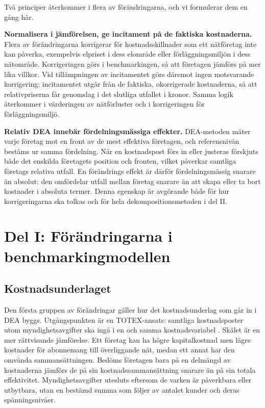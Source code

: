 \documentclass[11pt,a4paper]{article}
\begin{document}
Två principer återkommer i flera av förändringarna, och vi formulerar dem en gång här.

\textbf{Normalisera i jämförelsen, ge incitament på de faktiska kostnaderna.} Flera av
förändringarna korrigerar för kostnadsskillnader som ett nätföretag inte kan påverka, exempelvis
elpriset i dess elområde eller förläggningsmiljön i dess nätområde. Korrigeringen görs i
benchmarkingen, så att företagen jämförs på mer lika villkor. Vid tillämpningen av incitamentet
görs däremot ingen motsvarande korrigering: incitamentet utgår från de faktiska, okorrigerade
kostnaderna, så att relativpriserna får genomslag i det slutliga utfallet i kronor. Samma logik
återkommer i värderingen av nätförluster och i korrigeringen för förläggningsmiljö.

\textbf{Relativ DEA innebär fördelningsmässiga effekter.} DEA-metoden mäter varje företag mot en
front av de mest effektiva företagen, och referensnivån bestäms ur samma fördelning. När en
kostnadspost förs in eller justeras förskjuts både det enskilda företagets position och fronten,
vilket påverkar samtliga företags relativa utfall. En förändrings effekt är därför
fördelningsmässig snarare än absolut: den omfördelar utfall mellan företag snarare än att skapa
eller ta bort kostnader i absoluta termer. Denna egenskap är avgörande både för hur
korrigeringarna ska tolkas och för hela dekompositionsmetoden i del II.

\section{Del I: Förändringarna i benchmarkingmodellen}

\subsection{Kostnadsunderlaget}

Den första gruppen av förändringar gäller hur det kostnadsunderlag som går in i DEA byggs.
Utgångspunkten är en TOTEX-ansats: samtliga kostnadsposter utom myndighetsavgifter ska ingå i en
och samma kostnadsvariabel \citep{Ei2025Benchmarking}. Skälet är en mer rättvisande jämförelse. Ett företag kan ha högre
kapitalkostnad men lägre kostnader för abonnemang till överliggande nät, medan ett annat har den
omvända sammansättningen. Bedöms företagen bara på en delmängd av kostnaderna jämförs de på sin
kostnadssammansättning snarare än på sin totala effektivitet. Myndighetsavgifter utesluts eftersom
de varken är påverkbara eller utbytbara, utan en bestämd summa som följer av antalet kunder och
deras spänningsnivåer.
\end{document}
